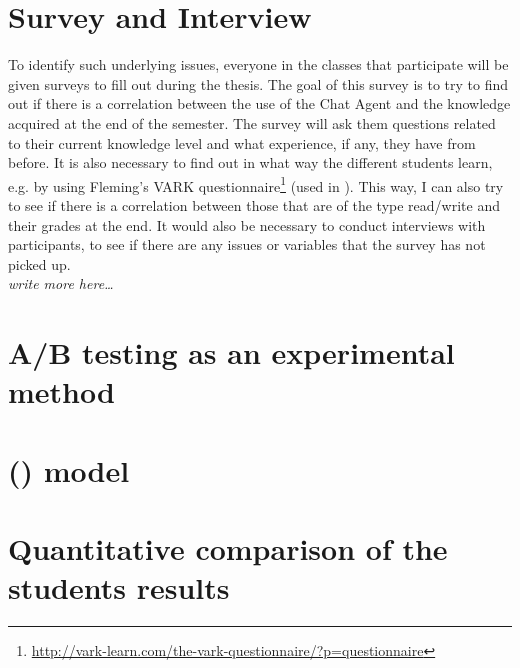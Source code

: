 \section{Survey and Interview}
\label{chapter4:survey_and_interview}
To identify such underlying issues, everyone in the classes that participate will be given surveys to fill out during the thesis. The goal of this survey is to try 
to find out if there is a correlation between the use of the Chat Agent and the knowledge acquired at the end of the semester. The survey will ask them questions 
related to their current knowledge level and what experience, if any, they have from before. It is also necessary to find out in what way the different students learn, 
e.g. by using Fleming's VARK questionnaire\footnote{\url{http://vark-learn.com/the-vark-questionnaire/?p=questionnaire}} (used in \cite[p.~152]{Kowalski2013}). This way, 
I can also try to see if there is a correlation between those that are of the type read/write and their grades at the end.
\vspace{0.5em}\newline
It would also be necessary to conduct interviews with participants, to see if there are any issues or variables that the survey has not picked up. \\
\emph{write more here\ldots}

\section{A/B testing as an experimental method}
\label{chapter4:ab_testing_experimental}


\section{ () model}
\label{chapter4:qa_model}

\section{Quantitative comparison of the students results}
\label{chapter4:quantitative_comparison}

